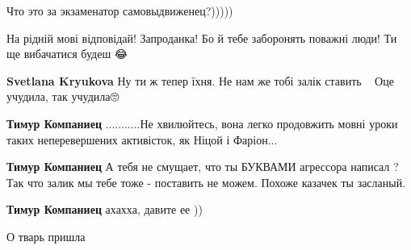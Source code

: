 \begin{itemize}
\begin{itemize}
Что это за экзаменатор самовыдвиженец?)))))

 
На рідній мові відповідай! Запроданка! Бо й тебе заборонять поважні люди! Ти ще вибачатися будеш 😂

 
\textbf{Svetlana Kryukova} Ну ти ж тепер їхня. Не нам же тобі залік ставить🤣🤣🤣 Оце учудила, так учудила🙄

 
\textbf{Тимур Компаниец} ...........Не хвилюйтесь, вона легко продовжить мовні уроки таких неперевершених активісток, як Ніцой і Фаріон...

 
\textbf{Тимур Компаниец} А тебя не смущает, что ты БУКВАМИ агрессора написал ? Так что залик мы тебе тоже - поставить не можем. Похоже казачек ты засланый.

 
\textbf{Тимур Компаниец} ахахха, давите ее ))

 
О тварь пришла

 

\end{itemize}
\end{itemize}
